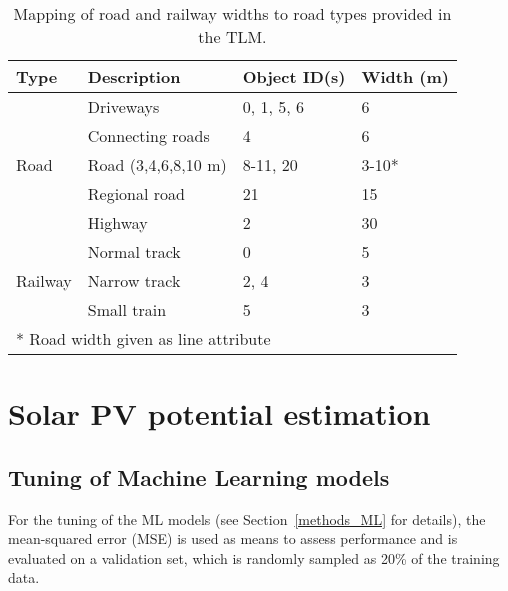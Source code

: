 \begin{table}[ht]
\centering
\footnotesize
\caption{Mapping of road and railway widths to road types provided in the TLM.}
\label{tab:roads}

\begin{tabular}{llll}
\hline
\textbf{Type}            & \textbf{Description}    & \textbf{Object ID(s) \cite{swisstopo_swisstlm3d_2018}} & \textbf{Width (m)} \\ \hline
\multirow{5}{*}{Road}    & Driveways           & 0, 1, 5, 6                      & 6                  \\
                         & Connecting roads    & 4                               & 6                  \\
                         & Road (3,4,6,8,10 m) & 8-11, 20                        & 3-10*              \\
                         & Regional road       & 21                              & 15                 \\
                         & Highway             & 2                               & 30                 \\ \hline
\multirow{3}{*}{Railway} & Normal track        & 0                               & 5                  \\
                         & Narrow track        & 2, 4                            & 3                  \\
                         & Small train         & 5                               & 3                  \\ \hline
\multicolumn{4}{l}{* Road width given as line attribute}                                             
\end{tabular}
\end{table}


\chapter{Solar PV potential estimation}

\section{Tuning of Machine Learning models}
\label{app:tuning}
%
For the tuning of the ML models (see Section~\ref{methods_ML} for details), the mean-squared error (MSE) is used as means to assess performance and is evaluated on a validation set, which is randomly sampled as 20\% of the training data. 

